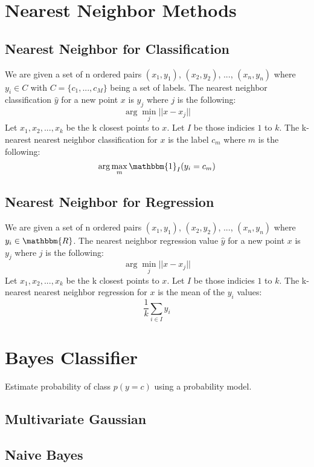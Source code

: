 \documentclass[twoside,11pt]{article}
\theoremstyle{definition}
\begin{document}
\section{Nearest Neighbor Methods}

\subsection{Nearest Neighbor for Classification}

We are given a set of n ordered pairs $(x_1,y_1)$, $(x_2,y_2)$, ..., $(x_n,y_n)$ where $y_i \in C$ with $C=\{ c_1, ..., c_M \}$ being a set of labels. The nearest neighbor classification $\hat{y}$ for a new point $x$ is $y_j$ where $j$ is the following:
\[
\arg \min_j||x-x_j||
\]
Let $x_1,x_2,...,x_k$ be the k closest points to $x$. Let $I$ be those indicies $1$ to $k$. The k-nearest nearest neighbor classification for $x$ is the label $c_m$ where $m$ is the following:
\[
\arg \max_m \mathbbm{1}_{I}{(y_i=c_m)}
\]

\subsection{Nearest Neighbor for Regression}

We are given a set of n ordered pairs $(x_1,y_1)$, $(x_2,y_2)$, ..., $(x_n,y_n)$ where $y_i \in \mathbbm{R}$. The nearest neighbor regression value $\hat{y}$ for a new point $x$ is $y_j$ where $j$ is the following:
\[
\arg \min_j||x-x_j||
\]
Let $x_1,x_2,...,x_k$ be the k closest points to $x$. Let $I$ be those indicies $1$ to $k$. The k-nearest nearest neighbor regression for $x$ is the mean of the $y_i$ values:
\[
\frac{1}{k} \sum_{i \in I} y_i
\]

\section{Bayes Classifier}

Estimate probability of class $p(y=c)$ using a probability model. 

\subsection{Multivariate Gaussian}

\subsection{Naive Bayes}
\end{document}
